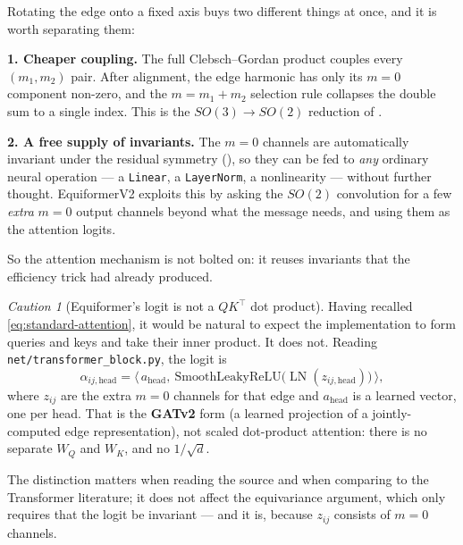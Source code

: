\documentclass[11pt,a4paper]{report}
\theoremstyle{definition}
\theoremstyle{remark}
\newtheorem{caution}[caution]{Caution}
\DeclareMathOperator{\LN}{LN}
\newcommand{\file}[1]{\texttt{#1}}
\begin{document}
\begin{tcolorbox}[colback=green!3,colframe=green!35!black,title={The two payoffs of edge alignment}]
Rotating the edge onto a fixed axis buys two different things at once, and
it is worth separating them:

\textbf{1. Cheaper coupling.} The full Clebsch--Gordan product couples every
$(m_1,m_2)$ pair. After alignment, the edge harmonic has only its $m=0$
component non-zero, and the $m=m_1+m_2$ selection rule collapses the double
sum to a single index. This is the $SO(3)\to SO(2)$ reduction of
.

\textbf{2. A free supply of invariants.} The $m=0$ channels are
automatically invariant under the residual symmetry
(), so they can be fed to \emph{any} ordinary neural
operation --- a \texttt{Linear}, a \texttt{LayerNorm}, a nonlinearity ---
without further thought. EquiformerV2 exploits this by asking the $SO(2)$
convolution for a few \emph{extra} $m=0$ output channels beyond what the
message needs, and using them as the attention logits.

So the attention mechanism is not bolted on: it reuses invariants that the
efficiency trick had already produced.
\end{tcolorbox}

\begin{caution}[Equiformer's logit is not a $QK^\top$ dot product]
\label{caution:not-qk-attention}
Having recalled \eqref{eq:standard-attention}, it would be natural to expect
the implementation to form queries and keys and take their inner product.
It does not. Reading
\file{net/transformer\_block.py}, the logit is
\[
\alpha_{ij,\mathrm{head}}
=\bigl\langle\, a_{\mathrm{head}},\ \mathrm{SmoothLeakyReLU}\bigl(\LN(z_{ij,\mathrm{head}})\bigr)\,\bigr\rangle,
\]
where $z_{ij}$ are the extra $m=0$ channels for that edge and
$a_{\mathrm{head}}$ is a learned vector, one per head. That is the
\textbf{GATv2} form (a learned projection of a jointly-computed edge
representation), not scaled dot-product attention: there is no separate
$W_Q$ and $W_K$, and no $1/\sqrt d$.

The distinction matters when reading the source and when comparing to the
Transformer literature; it does not affect the equivariance argument, which
only requires that the logit be invariant --- and it is, because $z_{ij}$
consists of $m=0$ channels.
\end{caution}
\end{document}
